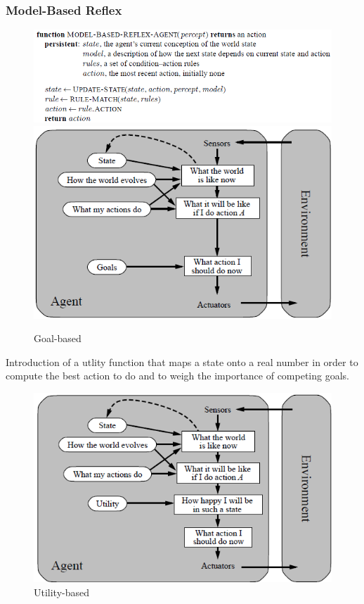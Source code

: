 \documentclass{article}
\begin{document}
\subsubsection{Model-Based Reflex}
\begin{figure}[h!]
\includegraphics[scale=0.5]{4.png}
\includegraphics[scale=0.36]{5.png}
\caption{Goal-based}
\end{figure}
Introduction of a utlity function that maps a state onto a real number in order to compute the best action to do and to weigh the importance of competing goals.
\begin{figure}[h!]
\includegraphics[scale=0.5]{6.png}
\caption{Utility-based}
\end{figure}
\end{document}
